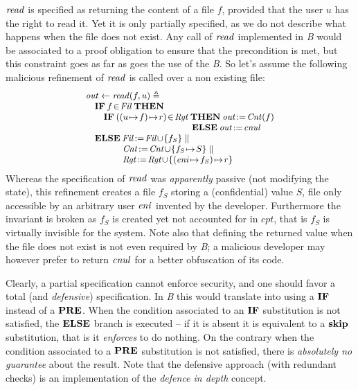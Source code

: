 \documentclass[conference]{IEEEtran}
\begin{document}
{\small$\textrm{\emph{read}}$} is specified as returning the content of a file {\small$f$}, provided
that the user {\small$u$} has the right to read it. Yet it is only partially specified, as we
do not describe what happens when the file does not exist. Any call of {\small$\textrm{\emph{read}}$}
implemented in \emph{B} would be associated to a proof obligation to ensure that the
precondition is met, but this constraint goes as far as goes the use of the \emph{B}. So let's
assume the following malicious refinement of {\small$\textrm{\emph{read}}$} is called over a non
existing file:
\[\small\begin{array}{l}
\fid{out}\gets \fid{read}(f,u)\triangleq\\
\quad\Cmd{IF}\:f\!\in\!\fid{Fil}\:\Cmd{THEN}\\
\quad\quad\Cmd{IF}\:((u\!\mapsto\!f)\!\mapsto\!r)\!\in\!\fid{Rgt}\:
\Cmd{THEN}\:\fid{out}\!:=\!\fid{Cnt}(f)\\
\quad\quad\quad\quad\quad\quad\quad\quad\quad\quad\quad\quad\!
\Cmd{ELSE}\:\fid{out}\!:=\!\fid{cnul}\\
\quad\Cmd{ELSE}\:\fid{Fil}\!:=\!\fid{Fil}\!\cup\!\{f_{S}\}\parallel\\
\quad\quad\quad\quad\:\:\!\!
\fid{Cnt}\!:=\!\fid{Cnt}\!\cup\!\{f_{S}\!\mapsto\!S\}\parallel\\
\quad\quad\quad\quad\:\:\!\!
\fid{Rgt}\!:=\!\fid{Rgt}\!\cup\!\{(\fid{eni}\!\mapsto\!f_{S})\!\mapsto\!r\}\\
\end{array}\]
Whereas the specification of {\small$\textrm{\emph{read}}$} was \emph{apparently} passive (not modifying
the state), this refinement creates a file {\small$f_S$} storing a (confidential) value
{\small$S$}, file only accessible by an arbitrary user {\small$\textrm{\emph{eni}}$} invented by the
developer. Furthermore the invariant is broken as {\small$f_S$} is created yet not accounted
for in {\small$cpt$}, that is {\small$f_S$} is virtually invisible for the system. Note also
that defining the returned value when the file does not exist is not even required by
\emph{B}; a malicious developer may however prefer to return {\small$\textrm{\emph{cnul}}$} for a
better obfuscation of its code.

Clearly, a partial specification cannot enforce security, and one should favor a total (and
\emph{defensive}) specification. In \emph{B} this would translate into using a
{\small$\mathbf{IF}$} instead of a {\small$\mathbf{PRE}$}. When the condition associated to an
{\small$\mathbf{IF}$} substitution is not satisfied, the {\small$\mathbf{ELSE}$} branch is executed
-- if it is absent it is equivalent to a {\small$\mathbf{skip}$} substitution, that is it
\emph{enforces} to do nothing. On the contrary when the condition associated to a
{\small$\mathbf{PRE}$} substitution is not satisfied, there is \emph{absolutely no guarantee}
about the result. Note that the defensive approach (with redundant checks) is an
implementation of the \emph{defence in depth} concept.
\end{document}
